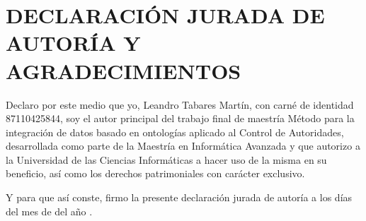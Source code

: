 \chapter*{\large DECLARACIÓN JURADA DE AUTORÍA Y AGRADECIMIENTOS}

\lhead{}
\chead{}
\lfoot{}
\cfoot{}
\rfoot{\thepage}
\renewcommand{\headrulewidth}{0.4pt}

Declaro por este medio que yo, Leandro Tabares Martín, con carné de identidad 87110425844, soy el autor principal del trabajo final de maestría Método para la integración de datos basado en ontologías aplicado al Control de Autoridades, desarrollada como parte de la Maestría en Informática Avanzada y que autorizo a la Universidad de las Ciencias Informáticas a hacer uso de la misma en su beneficio, así como los derechos patrimoniales con carácter exclusivo.

\espacios

Y para que así conste, firmo la presente declaración jurada de autoría a los \fillDia días del mes de \fillMes del año \fillAnno.

\espacios
\espacios

\firmaTesis

